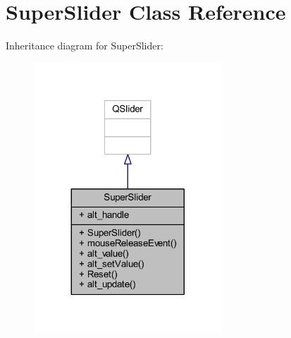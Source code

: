 \hypertarget{class_super_slider}{}\section{Super\+Slider Class Reference}
\label{class_super_slider}


Inheritance diagram for Super\+Slider\+:
\nopagebreak
\begin{figure}[H]
\begin{center}
\leavevmode
\includegraphics[width=200pt]{class_super_slider__inherit__graph}
\end{center}
\end{figure}


